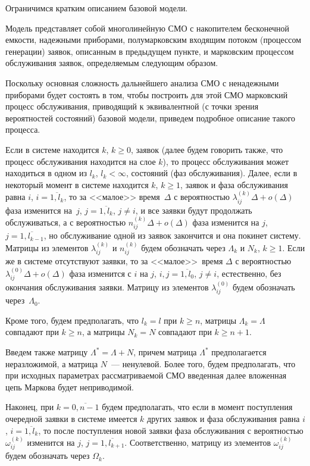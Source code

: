 \begin{multicols}{2}
Ограничимся кратким описанием базовой модели.

Модель представляет собой многолинейную СМО с накопителем бесконечной
емкости, надежными приборами, полумарковским входящим потоком
(процессом генерации) заявок, описанным в предыдущем пункте, и марковским
процессом обслуживания заявок, определяемым следующим образом.

Поскольку основная сложность дальнейшего анализа СМО с
ненадежными приборами будет состоять в том, чтобы построить для
этой СМО марковский процесс обслуживания, приводящий к
эквивалентной (с точки зрения вероятностей состояний) базовой
модели, приведем подробное описание такого процесса.

Если в системе находится $k$, $k\ge 0$, заявок (далее
будем говорить также, что процесс обслуживания находится на
слое $k$), то процесс обслуживания может находиться в одном
из $l_k$, $l_k<\infty$, состояний (фаз обслуживания).
Далее, если в некоторый момент в системе находится $k$, $k \ge 1$,
заявок и фаза обслуживания равна $i$, $i=\overline{1,l_k}$, то
за <<малое>> вре\-мя~$\Delta$ с вероятностью
$\lambda^{(k)}_{ij}\Delta + o(\Delta)$ фаза изменится на~$j$,
$j=\overline{1,l_k}$, $j\ne i$, и все заявки будут продолжать
обслуживаться,
а с вероятностью $n^{(k)}_{ij}\Delta + o(\Delta)$ фаза изменится
на $j$, $j=\overline{1,l_{k-1}}$, но обслуживание одной из
заявок закончится и она покинет систему. Матрицы из элементов
$\lambda^{(k)}_{ij}$ и $n^{(k)}_{ij}$ будем обозначать через
$\Lambda_k$ и $N_k$, $k \ge 1$.
Если же в системе отсутствуют заявки, то за <<малое>>\ время $\Delta$
с вероятностью $\lambda^{(0)}_{ij}\Delta + o(\Delta)$ фаза изменится
с $i$ на $j$, $i,j=\overline{1,l_0}$, $j\ne i$, естественно,
без окончания обслуживания заявки.
Матрицу из элементов $\lambda^{(0)}_{ij}$ будем обозначать через~$\Lambda_0$.

Кроме того, будем предполагать, что $l_k=l$ при
$k \ge n$, матрицы $\Lambda_k = \Lambda$ совпадают при
$k \ge n$, а матрицы $N_k = N$ совпадают при
$k \ge n+1$.

Введем также матрицу $\Lambda^* = \Lambda+N$, причем матрица
$\Lambda^*$ предполагается неразложимой, а мат\-ри\-ца $N$~---
ненулевой. Более того, будем предполагать, что при исходных
параметрах рассматриваемой СМО введенная далее вложенная цепь
Маркова будет неприводимой.

Наконец, при $k=\overline{0,n-1}$ будем предполагать, что если в
момент поступления очередной заявки в системе имеется $k$ других
заявок и фаза обслуживания равна $i$, $i=\overline{1,l_k}$, то
после поступления новой заявки фаза обслуживания с вероятностью
$\omega^{(k)}_{ij}$ изменится на $j$, $j=\overline{1,l_{k+1}}$.
Соответственно, матрицу из элементов $\omega^{(k)}_{ij}$ будем
обозначать через $\Omega_k$.


\end{multicols}
